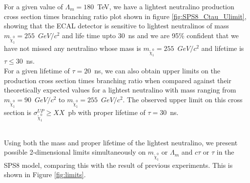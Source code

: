 For a given value of $\Lambda_{m} = 180$~TeV, we have a lightest neutralino production cross section times branching ratio plot shown in figure \ref{fig:SPS8_Ctau_Ulimit}, showing that the ECAL detector is sensitive to lightest neutralinos of mass $m_{\tilde{\chi}^{0}_{1}} = 255$~$GeV/c^{2}$ and life time upto $30$~ns and we are 95\% confident that we have not missed any neutralino whose mass is $m_{\tilde{\chi}^{0}_{1}} = 255$~$GeV/c^{2}$ and lifetime is $\tau \leq 30$~ns.
\mbox{}\\
For a given lifetime of $\tau = 20$~ns, we can also obtain upper limits on the production cross section times branching ratio when compared against their theoretically expected values for a lightest neutralino with mass ranging from $m_{\tilde{\chi}^{0}_{1}} = 90$~$GeV/c^{2}$ to $m_{\tilde{\chi}^{0}_{1}} = 255$~$GeV/c^{2}$. The observed upper limit on this cross section is $\sigma^{UP}_{\tilde{\chi}^{0}_{1}} \geq XX$~pb with proper lifetime of $\tau = 30$~ns.

\mbox{}\\
Using both the mass and proper lifetime of the lightest neutralino, we present possible 2-dimensional limits simultaneously on $m_{\tilde{\chi}^{0}_{1}}$ or $\Lambda_{m}$ and $c\tau$ or $\tau$ in the SPS8 model, comparing this with the result of previous experiments. This is shown in Figure \ref{fig:limits}.

